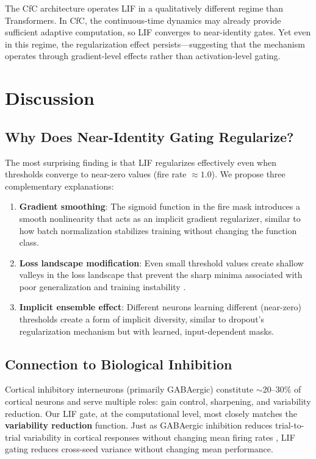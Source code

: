 \documentclass[11pt]{article}
\begin{document}
The CfC architecture operates LIF in a qualitatively different regime than Transformers. In CfC, the continuous-time dynamics may already provide sufficient adaptive computation, so LIF converges to near-identity gates. Yet even in this regime, the regularization effect persists---suggesting that the mechanism operates through gradient-level effects rather than activation-level gating.


\section{Discussion}

\subsection{Why Does Near-Identity Gating Regularize?}

The most surprising finding is that LIF regularizes effectively even when thresholds converge to near-zero values (fire rate $\approx 1.0$). We propose three complementary explanations:

\begin{enumerate}
    \item \textbf{Gradient smoothing}: The sigmoid function in the fire mask introduces a smooth nonlinearity that acts as an implicit gradient regularizer, similar to how batch normalization stabilizes training without changing the function class.
    \item \textbf{Loss landscape modification}: Even small threshold values create shallow valleys in the loss landscape that prevent the sharp minima associated with poor generalization and training instability \cite{hochreiter1997flat,keskar2017large}.
    \item \textbf{Implicit ensemble effect}: Different neurons learning different (near-zero) thresholds create a form of implicit diversity, similar to dropout's regularization mechanism but with learned, input-dependent masks.
\end{enumerate}

\subsection{Connection to Biological Inhibition}

Cortical inhibitory interneurons (primarily GABAergic) constitute $\sim$20--30\% of cortical neurons and serve multiple roles: gain control, sharpening, and variability reduction. Our LIF gate, at the computational level, most closely matches the \textbf{variability reduction} function. Just as GABAergic inhibition reduces trial-to-trial variability in cortical responses without changing mean firing rates \cite{churchland2010stimulus}, LIF gating reduces cross-seed variance without changing mean performance.
\end{document}
